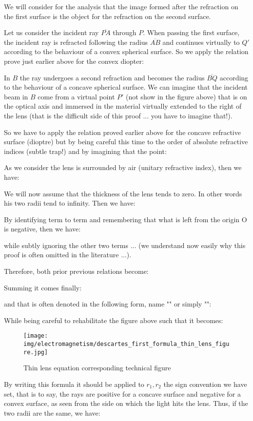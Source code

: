 	We will consider for the analysis that the image formed after the refraction on the first surface is the object for the refraction on the second surface.

	Let us consider the incident ray $\overline{PA}$ through $P$. When passing the first surface, the incident ray is refracted following the radius $\overline{AB}$ and continues virtually to $Q'$ according to the behaviour of a convex spherical surface. So we apply the relation prove just earlier above for the convex diopter:	
	
	In $B$ the ray undergoes a second refraction and becomes the radius $\overline{BQ}$ according to the behaviour of a concave spherical surface. We can imagine that the incident beam in $B$ come from a virtual point $P'$ (not show in the figure above) that is on the optical axis and immersed in the material virtually extended to the right of the lens (that is the difficult side of this proof ... you have to imagine that!).

	So we have to apply the relation proved earlier above for the concave refractive surface (dioptre) but by being careful this time to the order of absolute refractive indices (subtle trap!) and by imagining that the point:
	
	As we consider the lens is surrounded by air (unitary refractive index), then we have:
	
	We will now assume that the thickness of the lens tends to zero. In other words his two radii tend to infinity. Then we have:
	
	By identifying term to term and remembering that what is left from the origin O is negative, then we have:
	
	while subtly ignoring the other two terms ... (we understand now easily why this proof is often omitted in the literature ...).

	Therefore, both prior previous relations become:
	
	Summing it comes finally:
	
	and that is often denoted in the following form, name "" or simply "":
	
	While being careful to rehabilitate the figure above such that it becomes:
	\begin{figure}[H]
		\centering
		\texttt{[image: img/electromagnetism/descartes\_first\_formula\_thin\_lens\_figure.jpg]}
		\caption{Thin lens equation corresponding technical figure}
	\end{figure}
	By writing this formula it should be applied to $r_1,r_2$ the sign convention we have set, that is to say, the rays are positive for a concave surface and negative for a convex surface, as seen from the side on which the light hits the lens. Thus, if the two radii are the same, we have:
	
